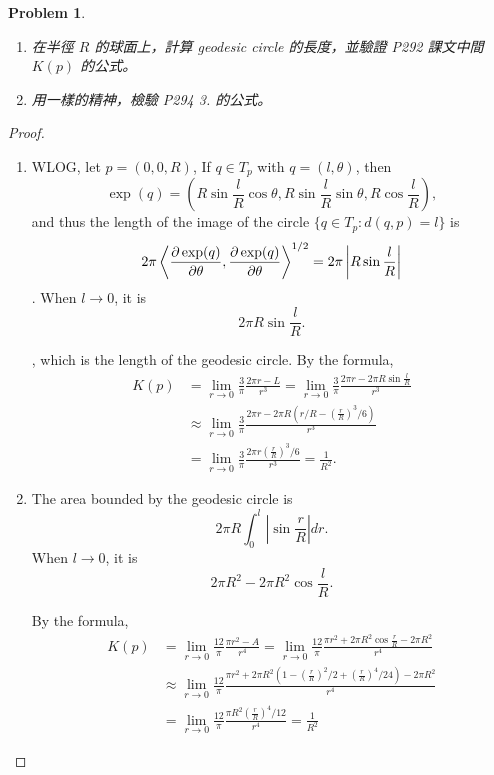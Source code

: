 \documentclass[10pt,a4paper]{article}
\newcounter{theProblemCounter}
\newtheorem{problem}[theProblemCounter]{Problem}
\begin{document}
\setcounter{theProblemCounter}{7}
\begin{problem}\hspace*{1em}
\begin{enumerate}
\item[(a)] 在半徑 $R$ 的球面上，計算 geodesic circle 的長度，並驗證 P292 課文中間 $K(p)$ 的公式。
\item[(b)] 用一樣的精神，檢驗 P294 3. 的公式。
\end{enumerate}
\end{problem}
\begin{proof}
\begin{enumerate}
\item[(a)]
WLOG, let $p = (0, 0, R)$, If $q\in T_p$ with $q = (l, \theta)$, then
$$
\exp(q) = \left(R\sin\frac{l}{R}\cos\theta, R\sin\frac{l}{R}\sin\theta, R\cos\frac{l}{R}\right),
$$
and thus the length of the image of the circle $\{q\in T_p : d(q, p) = l\}$ is
$$
2\pi\left\langle\frac{\partial \exp(q)}{\partial \theta}, \frac{\partial \exp(q)}{\partial \theta}\right\rangle^{1/2} = 2\pi\left|R\sin\frac{l}{R}\right|
$$
. When $l\rightarrow 0$, it is $$2\pi R\sin\frac{l}{R}.$$

, which is the length of the geodesic circle. By the formula,
\begin{align*}
K(p) &= \lim_{r\rightarrow 0}\frac{3}{\pi}\frac{2\pi r - L}{r^3} = \lim_{r\rightarrow 0}\frac{3}{\pi}\frac{2\pi r - 2\pi R\sin\frac{l}{R}}{r^3}\\ &\approx \lim_{r\rightarrow 0}\frac{3}{\pi}\frac{2\pi r - 2\pi R\left(r/R - \left(\frac rR\right)^3/6\right)}{r^3} \\ &=
\lim_{r\rightarrow 0}\frac{3}{\pi}\frac{2\pi r\left(\frac rR\right)^3/6}{r^3} = \frac{1}{R^2}.
\end{align*}

\item[(b)]
The area bounded by the geodesic circle is
$$
2\pi R\int^l_0 \left|\sin\frac{r}{R}\right| dr.
$$
When $l\rightarrow 0$, it is $$2\pi R^2 - 2\pi R^2\cos\frac lR.$$

By the formula, 
\begin{align*}
K(p) &= \lim_{r\rightarrow 0}\frac{12}{\pi}\frac{\pi r^2 - A}{r^4} = \lim_{r\rightarrow 0}\frac{12}{\pi}\frac{\pi r^2 + 2\pi R^2\cos\frac rR - 2\pi R^2}{r^4}\\ &\approx \lim_{r\rightarrow 0}\frac{12}{\pi}\frac{\pi r^2 + 2\pi R^2\left(1 - \left(\frac rR\right)^2/2 + \left(\frac rR\right)^4/24\right) - 2\pi R^2}{r^4} \\ &=
\lim_{r\rightarrow 0}\frac{12}{\pi}\frac{\pi R^2\left(\frac rR\right)^4/12}{r^4} = \frac{1}{R^2}
\end{align*}
\end{enumerate}
\end{proof}
\end{document}
